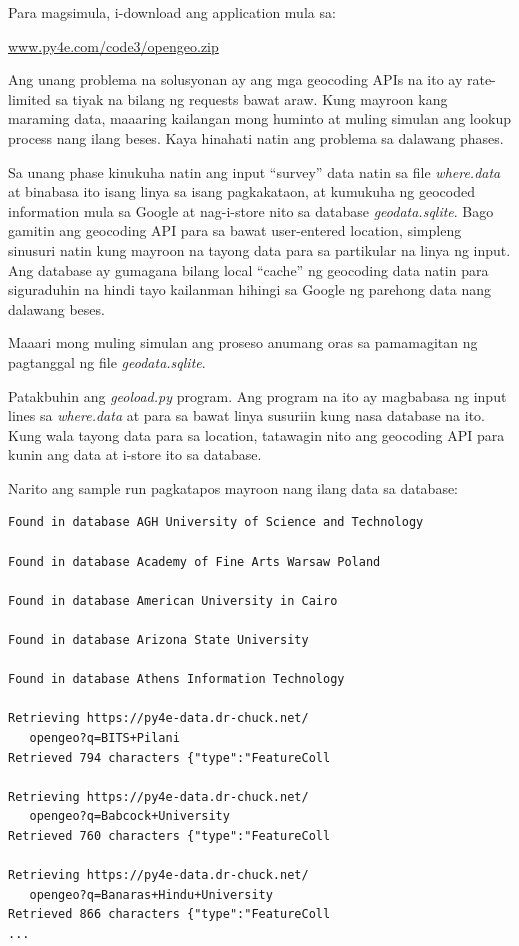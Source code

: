 \documentclass[10pt,]{book}
\begin{document}
Para magsimula, i-download ang application mula sa:

\href{http://www.py4e.com/code3/opengeo.zip}{www.py4e.com/code3/opengeo.zip}

Ang unang problema na solusyonan ay ang mga geocoding APIs na ito ay
rate-limited sa tiyak na bilang ng requests bawat araw. Kung mayroon
kang maraming data, maaaring kailangan mong huminto at muling simulan
ang lookup process nang ilang beses. Kaya hinahati natin ang problema sa
dalawang phases.


Sa unang phase kinukuha natin ang input ``survey'' data natin sa file
\emph{where.data} at binabasa ito isang linya sa isang pagkakataon, at
kumukuha ng geocoded information mula sa Google at nag-i-store nito sa
database \emph{geodata.sqlite}. Bago gamitin ang geocoding API para sa
bawat user-entered location, simpleng sinusuri natin kung mayroon na
tayong data para sa partikular na linya ng input. Ang database ay
gumagana bilang local ``cache'' ng geocoding data natin para siguraduhin
na hindi tayo kailanman hihingi sa Google ng parehong data nang dalawang
beses.

Maaari mong muling simulan ang proseso anumang oras sa pamamagitan ng
pagtanggal ng file \emph{geodata.sqlite}.

Patakbuhin ang \emph{geoload.py} program. Ang program na ito ay
magbabasa ng input lines sa \emph{where.data} at para sa bawat linya
susuriin kung nasa database na ito. Kung wala tayong data para sa
location, tatawagin nito ang geocoding API para kunin ang data at
i-store ito sa database.

Narito ang sample run pagkatapos mayroon nang ilang data sa database:

{\small
\begin{verbatim}
Found in database AGH University of Science and Technology

Found in database Academy of Fine Arts Warsaw Poland

Found in database American University in Cairo

Found in database Arizona State University

Found in database Athens Information Technology

Retrieving https://py4e-data.dr-chuck.net/
   opengeo?q=BITS+Pilani
Retrieved 794 characters {"type":"FeatureColl

Retrieving https://py4e-data.dr-chuck.net/
   opengeo?q=Babcock+University
Retrieved 760 characters {"type":"FeatureColl

Retrieving https://py4e-data.dr-chuck.net/
   opengeo?q=Banaras+Hindu+University
Retrieved 866 characters {"type":"FeatureColl
...
\end{verbatim}
}
\end{document}

